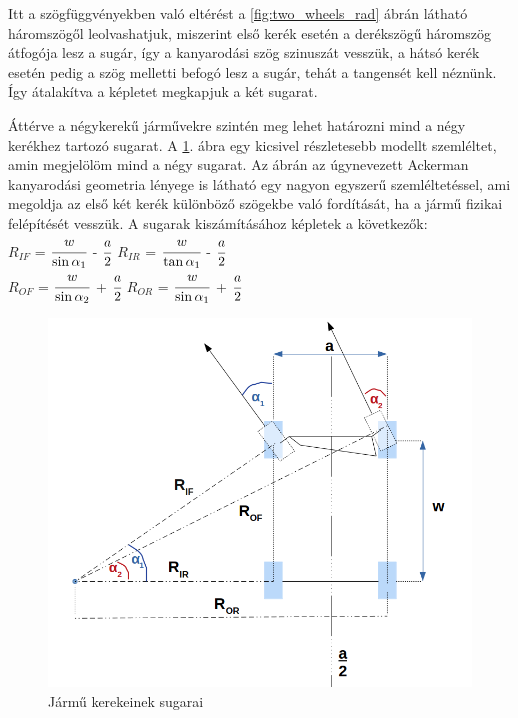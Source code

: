 Itt a szögfüggvényekben való eltérést a \ref{fig:two_wheels_rad} ábrán látható háromszögől leolvashatjuk, miszerint első kerék esetén a derékszögű háromszög átfogója lesz a sugár, így a kanyarodási szög szinuszát vesszük, a hátsó kerék esetén pedig a szög melletti befogó lesz a sugár, tehát a tangensét kell néznünk. Így átalakítva a képletet megkapjuk a két sugarat.   



Áttérve a négykerekű járművekre szintén meg lehet határozni mind a négy kerékhez tartozó sugarat. A \ref{fig:each_wheel_radius}. ábra egy kicsivel részletesebb modellt szemléltet, amin megjelölöm mind a négy sugarat. Az ábrán az úgynevezett Ackerman kanyarodási geometria lényege is látható egy nagyon egyszerű szemléltetéssel, ami megoldja az első két kerék különböző szögekbe való fordítását, ha a jármű fizikai felépítését vesszük. A sugarak kiszámításához képletek a következők:
\\
$R_{IF}$ =  $\cfrac{w}{\sin\alpha_1}$ - $\cfrac{a}{2}$\qquad
$R_{IR}$ =  $\cfrac{w}{\tan\alpha_1}$ - $\cfrac{a}{2}$\\
$R_{OF}$ =  $\cfrac{w}{\sin\alpha_2}$ + $\cfrac{a}{2}$\qquad
$R_{OR}$ =  $\cfrac{w}{\sin\alpha_1}$ + $\cfrac{a}{2}$\\

\begin{figure}[h!]
\centering
\includegraphics[scale=0.45]{images/each_wheel_radius.png}
\caption{Jármű kerekeinek sugarai}
\label{fig:each_wheel_radius}
\end{figure}

